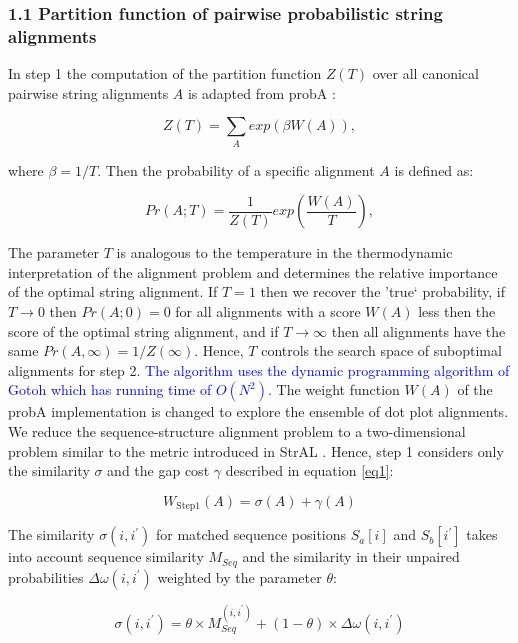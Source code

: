 \documentclass{bmcart}
\begin{document}
\subsubsection*{1.1 Partition function of pairwise probabilistic string alignments}
In step 1 the computation of the partition function $Z(T)$ over all canonical pairwise
string alignments $A$ is adapted from probA \cite{Muckstein12385998}:

\begin{equation}\label{probA_Z}
	Z(T) = \sum_A exp( \beta W(A) ),
\end{equation}

\noindent where $\beta = 1/T$. Then the probability of a specific alignment $A$ is defined as:

\begin{equation}\label{probA}
	Pr(A;T) = \frac{1}{Z(T)} exp( \frac{W(A)}{T} ),
\end{equation}

\noindent The parameter $T$ is analogous to the temperature in the
thermodynamic interpretation of the alignment problem and determines the
relative importance of the optimal string alignment. If $T=1$ then we recover the
'true` probability, if $T\to0$ then $Pr(A;0)=0$ for all alignments with a score
$W(A)$ less then the score of the optimal string alignment, and if $T\to\infty$ then
all alignments have the same $Pr(A,\infty)=1/Z(\infty)$.  Hence, $T$ controls
the search space of suboptimal alignments for step 2. \textcolor{blue}{
The algorithm uses the dynamic programming algorithm of Gotoh \cite{Gotoh7166760} which has running time of $O(N^2)$.} 
The weight function $W(A)$ of
the probA implementation is changed to explore the ensemble of dot plot
alignments. We reduce the sequence-structure alignment problem to a
two-dimensional problem similar to the metric introduced in StrAL
\cite{Dalli16613908}. Hence, step 1 considers only the similarity $\sigma$ and
the gap cost $\gamma$ described in equation \ref{eq1}:

\begin{equation}\label{wstep1}
	W_{\mbox{Step1}}(A) = \sigma(A) + \gamma(A)
\end{equation}

\noindent The similarity $\sigma(i,i^\prime)$ for matched sequence positions $S_a[i]$ and
$S_b[i^\prime]$ takes into account sequence similarity $M_{Seq}$ and the
similarity in their unpaired probabilities $\Delta \omega(i,i^\prime)$ weighted
by the parameter $\theta$:

\begin{equation}\label{sigmam}
	\sigma(i,i^\prime) = \theta \times
		M_{Seq}^{(i,i^\prime)} + (1-\theta) \times \Delta \omega(i,i^\prime)
\end{equation}
\end{document}
